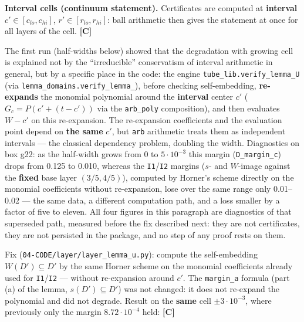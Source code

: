 \textbf{Interval cells (continuum statement).} Certificates are computed at
\textbf{interval} $c' \in [c_{lo}, c_{hi}]$, $r' \in [r_{lo}, r_{hi}]$: ball arithmetic then
gives the statement at once for all layers of the cell. \textbf{[C]}

The first run (half-widths below) showed that the degradation with growing
cell is explained not by the ``irreducible'' conservatism of interval
arithmetic in general, but by a specific place in the code: the engine
\texttt{tube\_\allowbreak lib.verify\_\allowbreak lemma\_\allowbreak U} (via \texttt{lemma\_\allowbreak domains.verify\_\allowbreak lemma\_}), before checking
self-embedding, \textbf{re-expands} the monomial polynomial around the \textbf{interval}
center $c'$ ($G_c = P(c' + (t-c'))$ via the \texttt{arb\_poly} composition), and then
evaluates $W - c'$ on this re-expansion. The re-expansion coefficients and the
evaluation point depend on \textbf{the same} $c'$, but \texttt{arb} arithmetic treats them
as independent intervals --- the classical dependency problem, doubling the
width. Diagnostics on box g22: as the half-width grows from 0 to $5\cdot 10^{-3}$
this margin (\texttt{D\_margin\_c}) drops from 0.125 to 0.010, whereas the \texttt{I1}/\texttt{I2}
margins ($s$- and $W$-image against the \textbf{fixed} base layer $(3/5,4/5)$),
computed by Horner's scheme directly on the monomial coefficients without
re-expansion,
lose over the same range only 0.01--0.02 --- the same data, a
different computation path, and a loss smaller by a factor of five to eleven.
All four figures in this paragraph are diagnostics of that superseded path,
measured before the fix described next: they are not certificates, they are not
persisted in the package, and no step of any proof rests on them.

Fix (\texttt{04-\allowbreak CODE/\allowbreak layer/\allowbreak layer\_\allowbreak lemma\_\allowbreak u.py}): compute the self-embedding
$W(D') \subseteq D'$ by the same Horner scheme on the monomial coefficients already
used for \texttt{I1}/\texttt{I2} --- without re-expansion around $c'$. The \texttt{margin\_a} formula
(part (a) of the lemma, $s(D')\subseteq D'$) was not changed: it does not re-expand
the polynomial and did not degrade. Result on the \textbf{same} cell $\pm 3\cdot 10^{-3}$,
where previously only the margin $8.72\cdot 10^{-4}$ held: \textbf{[C]}

